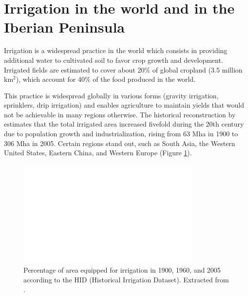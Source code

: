\section{Irrigation in the world and in the Iberian Peninsula}
Irrigation is a widespread practice in the world which consists in providing additional water to cultivated soil to favor crop growth and development.
Irrigated fields are estimated to cover about 20\% of global cropland (3.5 million km$^2$), which account for 40\% of the food produced in the world.

This practice is widespread globally in various forms (gravity irrigation, sprinklers, drip irrigation) and enables agriculture to maintain yields that would not be achievable in many regions otherwise. The historical reconstruction by \citet{siebert_global_2015} estimates that the total irrigated area increased fivefold during the 20th century due to population growth and industrialization, rising from 63 Mha in 1900 to 306 Mha in 2005. Certain regions stand out, such as South Asia, the Western United States, Eastern China, and Western Europe (Figure \ref{irrig_evolution_map}).

\begin{figure}[ht]
    \centering
    \includegraphics[width=\textwidth]{images/intro/irrig_evolution_Siebert.png}
    \caption{Percentage of area equipped for irrigation in 1900, 1960, and 2005 according to the HID (Historical Irrigation Dataset). Extracted from \citet{siebert_global_2015}.}
    \label{irrig_evolution_map}
\end{figure}


